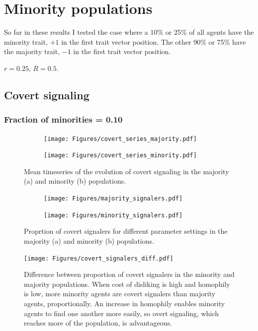 \documentclass[11pt,letterpaper]{article}
\begin{document}
\section{Minority populations}

So far in these results I tested the case where a 10\% or 25\% of all agents have
the minority trait, $+1$ in the first trait vector position. 
The other 90\% or 75\% have the majority trait, $-1$ in the first trait vector position.

$r=0.25$, $R=0.5$.

\subsection{Covert signaling}

\subsubsection{Fraction of minorities = 0.10}
\begin{figure}[H]
  \centering
  \begin{subfigure}{0.49\textwidth}
    \centering
    \texttt{[image: Figures/covert\_series\_majority.pdf]}
    \caption{}
    \label{fig:}
  \end{subfigure}
  \begin{subfigure}{0.49\textwidth}
    \centering
    \texttt{[image: Figures/covert\_series\_minority.pdf]}
    \caption{}
    \label{fig:}
  \end{subfigure}
  \caption{Mean timeseries of the evolution of covert signaling in the
    majority (a) and minority (b) populations.}
  \label{fig:}
\end{figure}


\begin{figure}[H]
  \centering
  \begin{subfigure}{0.49\textwidth}
    \centering
    \texttt{[image: Figures/majority\_signalers.pdf]}
    \caption{}
    \label{fig:}
  \end{subfigure}
  \begin{subfigure}{0.49\textwidth}
    \centering
    \texttt{[image: Figures/minority\_signalers.pdf]}
    \caption{}
    \label{fig:}
  \end{subfigure}
  \caption{Proprtion of covert signalers for different parameter settings in the
    majority (a) and minority (b) populations.}
  \label{fig:regressions}
\end{figure}

\begin{figure}[H]
  \centering
    \texttt{[image: Figures/covert\_signalers\_diff.pdf]}
  \caption{Difference between proportion of covert signalers in the minority 
    and majority populations. When cost of disliking is high and homophily is 
    low, more minority agents are covert signalers than majority agents,
    proportionally. An increase in homophily enables minority agents to 
    find one another more easily, so overt signaling, which reaches more of
    the population, is advantageous.
  }
  \label{fig:}
\end{figure}
\end{document}
